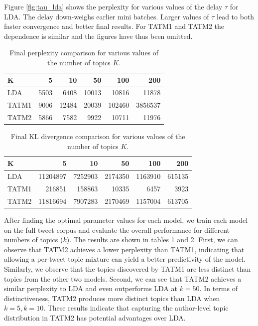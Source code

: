 Figure \ref{fig:tau_lda} shows the perplexity for various values of the delay $\tau$ for LDA. The delay down-weighs earlier mini batches. Larger values of $\tau$ lead to both faster convergence and better final results. For TATM1 and TATM2 the dependence is similar and the figures have thus been omitted.
%
\begin{table}[h]
\centering
\begin{tabular}{l||r|r|r|r|r}
K	&5 &	10&	50	&100&	200 \\ \hline \hline 
LDA	&5503&	6408&	10013 &10816	&11878\\ \hline
TATM1&	9006	&12484&	20039&	102460&	3856537 \\ \hline
TATM2&	5866	&7582&	9922&	10711& 11976 \\
\end{tabular}
\caption{Final perplexity comparison for various values of the number of topics $K$.}
\label{tab:perplexity}
\end{table}
%
\begin{table}[h]
\centering
\begin{tabular}{l||r|r|r|r|r}
K	&5 &	10&	50	&100&	200 \\ \hline \hline 
LDA	&11204897	&7252903	&2174350	&1163910 &615135  \\ \hline
TATM1	&216851 &158863	&10335	&6457	&3923 \\ \hline
TATM2	&11816694	&7907283&	2170469	&1157004 &613705  \\
\end{tabular}
\caption{Final KL divergence comparison for various values of the number of topics $K$.}
\label{tab:kl}
\end{table}
%

After finding the optimal parameter values for each model, we train each model on the full tweet corpus and evaluate the overall performance for different numbers of topics ($k$). The results are shown in tables \ref{tab:perplexity} and \ref{tab:kl}. First, we can observe that TATM2 achieves a lower perplexity than TATM1, indicating that allowing a per-tweet topic mixture can yield a better predictivity of the model. Similarly, we observe that the topics discovered by TATM1 are less distinct than topics from the other two models. Second, we can see that TATM2 achieves a similar perplexity to LDA and even outperforms LDA at $k=50$. In terms of distinctiveness, TATM2 produces more distinct topics than LDA when $k=5, k=10$. These results indicate that capturing the author-level topic distribution in TATM2 has potential advantages over LDA.